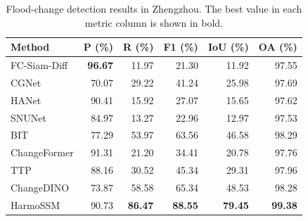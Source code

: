 \begingroup
\begin{table}[H]
\centering
\comparisonfont
\captionsetup{name=Table,font=comparisoncaption,labelfont=bf,labelsep=newline,justification=raggedright,singlelinecheck=false}
\caption{Flood-change detection results in Zhengzhou. The best value in each metric column is shown in bold.}
\label{tab:comparison_zhengzhou}
\fontsize{10}{12}\selectfont
\setlength{\tabcolsep}{6pt}
\renewcommand{\arraystretch}{1.15}
\begin{tabular*}{\linewidth}{@{\extracolsep{\fill}}lrrrrr@{}}
\toprule
Method & P (\%) & R (\%) & F1 (\%) & IoU (\%) & OA (\%) \\
\midrule
FC-Siam-Diff & \textbf{96.67} & 11.97 & 21.30 & 11.92 & 97.55 \\
CGNet & 70.07 & 29.22 & 41.24 & 25.98 & 97.69 \\
HANet & 90.41 & 15.92 & 27.07 & 15.65 & 97.62 \\
SNUNet & 84.97 & 13.27 & 22.96 & 12.97 & 97.53 \\
BIT & 77.29 & 53.97 & 63.56 & 46.58 & 98.29 \\
ChangeFormer & 91.31 & 21.20 & 34.41 & 20.78 & 97.76 \\
TTP & 88.16 & 30.52 & 45.34 & 29.31 & 97.96 \\
ChangeDINO & 73.87 & 58.58 & 65.34 & 48.53 & 98.28 \\
HarmoSSM & 90.73 & \textbf{86.47} & \textbf{88.55} & \textbf{79.45} & \textbf{99.38} \\
\bottomrule
\end{tabular*}
\end{table}
\endgroup
